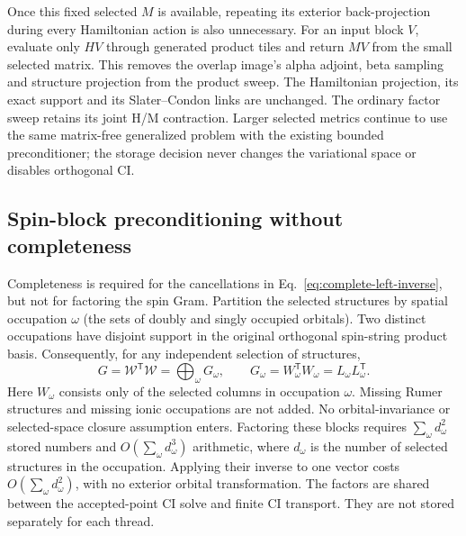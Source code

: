 \documentclass[11pt,a4paper]{article}
\newcommand{\Tr}{^{\mathsf T}}
\newcommand{\Wa}{\mathcal W}
\begin{document}
Once this fixed selected $M$ is available, repeating its exterior
back-projection during every Hamiltonian action is also unnecessary.
For an input block $V$, evaluate only $H V$ through generated product tiles
and return $M V$ from the small selected matrix. This removes the overlap
image's alpha adjoint, beta sampling and structure projection from the
product sweep. The Hamiltonian projection, its exact support and its
Slater--Condon links are unchanged. The ordinary factor sweep retains its
joint H/M contraction. Larger selected metrics continue to use the same
matrix-free generalized problem with the existing bounded preconditioner;
the storage decision never changes the variational space or disables
orthogonal CI.

\subsection{Spin-block preconditioning without completeness}
\label{sec:selected-spin-blocks}

Completeness is required for the cancellations in
Eq.~\eqref{eq:complete-left-inverse}, but not for factoring the spin Gram.
Partition the selected structures by spatial occupation $\omega$ (the
sets of doubly and singly occupied orbitals). Two distinct occupations have
disjoint support in the original orthogonal spin-string product basis.
Consequently, for any independent selection of structures,
\begin{equation}
 G=\Wa\Tr\Wa=\bigoplus_\omega G_\omega,
 \qquad G_\omega=W_\omega\Tr W_\omega=L_\omega L_\omega\Tr.
\end{equation}
Here $W_\omega$ consists only of the selected columns in occupation
$\omega$. Missing Rumer structures and missing ionic occupations are not
added. No orbital-invariance or selected-space closure assumption enters.
Factoring these blocks requires
$\sum_\omega d_\omega^2$ stored numbers and
$O(\sum_\omega d_\omega^3)$ arithmetic, where $d_\omega$ is the number of
selected structures in the occupation. Applying their inverse to one vector
costs $O(\sum_\omega d_\omega^2)$, with no exterior orbital transformation.
The factors are shared between the accepted-point CI solve and finite CI
transport. They are not stored separately for each thread.
\end{document}
